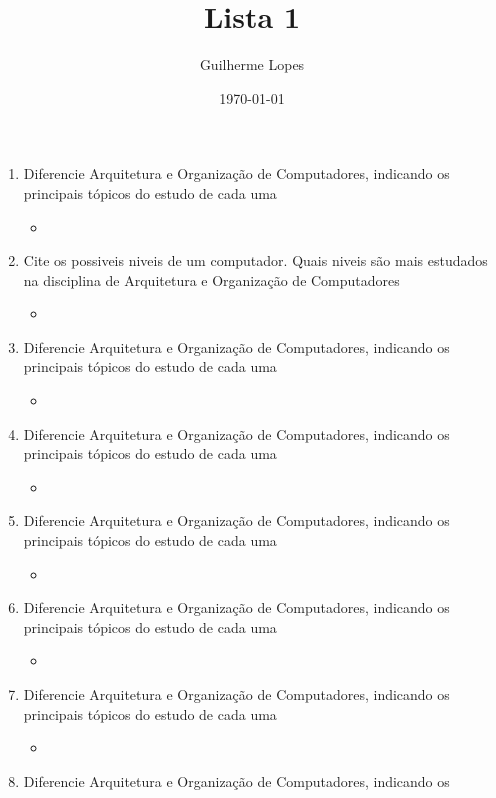 \documentclass[12pt]{article}
\title{Lista 1}
\author{Guilherme Lopes}
\date{\today}
\begin{document}
\begin{enumerate}
    \item Diferencie Arquitetura e Organização de Computadores, indicando os 
    principais tópicos do estudo de cada uma
    \begin{itemize}[label=R:]
        \item 
    \end{itemize}
    \item Cite os possiveis niveis de um computador. Quais niveis são mais 
    estudados na disciplina de Arquitetura e Organização de Computadores
    \begin{itemize}[label=R:]
        \item 
    \end{itemize}
    \item Diferencie Arquitetura e Organização de Computadores, indicando os 
    principais tópicos do estudo de cada uma
    \begin{itemize}[label=R:]
        \item 
    \end{itemize}
    \item Diferencie Arquitetura e Organização de Computadores, indicando os 
    principais tópicos do estudo de cada uma
    \begin{itemize}[label=R:]
        \item 
    \end{itemize}
    \item Diferencie Arquitetura e Organização de Computadores, indicando os 
    principais tópicos do estudo de cada uma
    \begin{itemize}[label=R:]
        \item 
    \end{itemize}
    \item Diferencie Arquitetura e Organização de Computadores, indicando os 
    principais tópicos do estudo de cada uma
    \begin{itemize}[label=R:]
        \item 
    \end{itemize}
    \item Diferencie Arquitetura e Organização de Computadores, indicando os 
    principais tópicos do estudo de cada uma
    \begin{itemize}[label=R:]
        \item 
    \end{itemize}
    \item Diferencie Arquitetura e Organização de Computadores, indicando os 

\end{enumerate}
\end{document}
